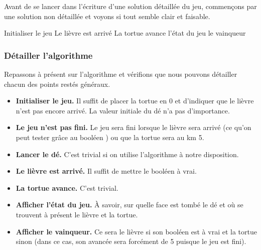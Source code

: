 			Avant de se lancer dans l'écriture d'une solution détaillée du jeu,
			commençons par une solution non détaillée
			et voyons si tout semble clair et faisable.
			
			\begin{LDA}
					\Stmt Initialiser le jeu
							\Stmt Le lièvre est arrivé
						\Else
							\Stmt La tortue avance
						\EndIf
						\Write l'état du jeu
					\EndWhile
					\Write le vainqueur
				\EndAlgo
			\end{LDA}
			
		\subsubsection*{Détailler l'algorithme}
	
			Repassons à présent sur l'algorithme
			et vérifions que nous pouvons détailler 
			chacun des points restés généraux.
			\begin{itemize}
			\item \textbf{Initialiser le jeu.}
				Il suffit de placer la tortue en 0
				et d'indiquer que le lièvre n'est pas encore arrivé.
				La valeur initiale du dé n'a pas d'importance.
			\item \textbf{Le jeu n'est pas fini.}
				Le jeu sera fini lorsque le lièvre sera arrivé
				(ce qu'on peut tester grâce au booléen )
				ou que la tortue sera au km 5.
			\item \textbf{Lancer le dé.}
				C'est trivial si on utilise l'algorithme 
				à notre disposition.
			\item \textbf{Le lièvre est arrivé.}
				Il suffit de mettre le booléen  à vrai.
			\item \textbf{La tortue avance.}
				C'est trivial.
			\item \textbf{Afficher l'état du jeu.}
				À savoir, sur quelle face est tombé le dé
				et où se trouvent à présent le lièvre et la tortue.
			\item \textbf{Afficher le vainqueur.}
				Ce sera le lièvre si son booléen est à vrai et la tortue sinon
				(dans ce cas, son avancée sera forcément de 5 
				puisque le jeu est fini).
			\end{itemize}

